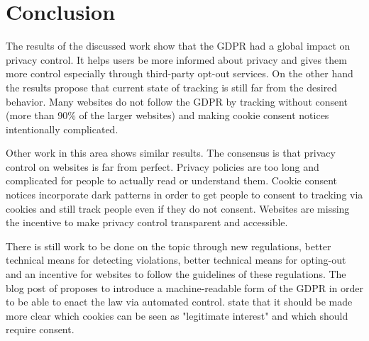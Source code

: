 \section{Conclusion}
\label{sec:conclusion}

The results of the discussed work show that the GDPR had a global impact on privacy control. It helps users be more
informed about privacy and gives them more control especially through third-party opt-out services. On the other hand
the results propose that current state of tracking is still far from the desired behavior. Many websites do not follow
the GDPR by tracking without consent (more than 90\% of the larger websites) and making cookie consent notices
intentionally complicated.

Other work in this area shows similar results. The consensus is that privacy control on
websites is far from perfect. Privacy policies are too long and complicated for people to actually read or understand
them. Cookie consent notices incorporate dark patterns in order to get people to consent to tracking via cookies and still
track people even if they do not consent. Websites are missing the incentive to make privacy control transparent and
accessible.

There is still work to be done on the topic through new regulations, better technical means for detecting violations,
better technical means for opting-out and an incentive for websites to follow the guidelines of these regulations. The
blog post of  proposes to introduce a machine-readable form of the GDPR in order to be able to enact
the law via automated control.  state that it should be made more clear which cookies can be seen as
"legitimate interest" and which should require consent.

